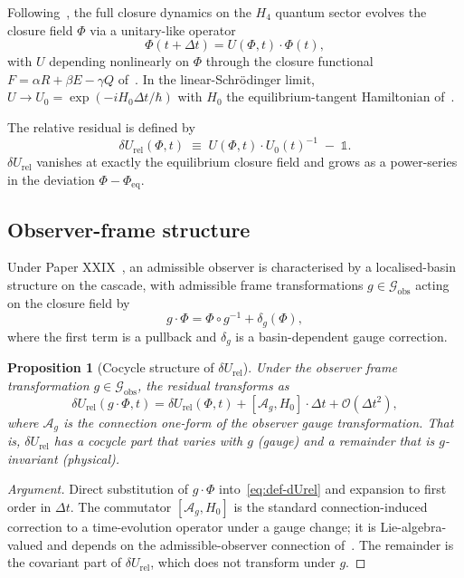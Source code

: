 \documentclass[12pt]{article}
\newtheorem{proposition}[theorem]{Proposition}
\theoremstyle{definition}
\theoremstyle{remark}
\newcommand{\dUrel}{\delta U_{\mathrm{rel}}}
\begin{document}
Following~\citep{SmartXXI}, the full closure dynamics on the $H_4$ quantum sector evolves the closure field $\Phi$ via a unitary-like operator
\begin{equation}\label{eq:full-dynamics}
\Phi(t + \Delta t) = U(\Phi, t) \cdot \Phi(t),
\end{equation}
with $U$ depending nonlinearly on $\Phi$ through the closure functional $F = \alpha R + \beta E - \gamma Q$ of~\citep{SmartXXXVI}. In the linear-Schr\"odinger limit, $U \to U_0 = \exp(-i H_0 \Delta t / \hbar)$ with $H_0$ the equilibrium-tangent Hamiltonian of~\citep{SmartXVIII}.

The relative residual is defined by
\begin{equation}\label{eq:def-dUrel}
\dUrel(\Phi, t) \;\equiv\; U(\Phi, t) \cdot U_0(t)^{-1} \;-\; \mathbb{1}.
\end{equation}
$\dUrel$ vanishes at exactly the equilibrium closure field and grows as a power-series in the deviation $\Phi - \Phi_{\mathrm{eq}}$.

\subsection{Observer-frame structure}

Under Paper XXIX~\citep{SmartXXIX}, an admissible observer is characterised by a localised-basin structure on the cascade, with admissible frame transformations $g \in \mathcal{G}_{\mathrm{obs}}$ acting on the closure field by
\begin{equation}
g \cdot \Phi = \Phi \circ g^{-1} + \delta_g(\Phi),
\end{equation}
where the first term is a pullback and $\delta_g$ is a basin-dependent gauge correction.

\begin{proposition}[Cocycle structure of $\dUrel$]\label{prop:cocycle}
Under the observer frame transformation $g \in \mathcal{G}_{\mathrm{obs}}$, the residual transforms as
\begin{equation}
\dUrel(g \cdot \Phi, t) = \dUrel(\Phi, t) + [\mathcal{A}_g, H_0] \cdot \Delta t + \mathcal{O}(\Delta t^2),
\end{equation}
where $\mathcal{A}_g$ is the connection one-form of the observer gauge transformation. That is, $\dUrel$ has a cocycle part that varies with $g$ (gauge) and a remainder that is $g$-invariant (physical).
\end{proposition}

\begin{proof}[Argument]
Direct substitution of $g \cdot \Phi$ into~\eqref{eq:def-dUrel} and expansion to first order in $\Delta t$. The commutator $[\mathcal{A}_g, H_0]$ is the standard connection-induced correction to a time-evolution operator under a gauge change; it is Lie-algebra-valued and depends on the admissible-observer connection of~\citep{SmartXXIX}. The remainder is the covariant part of $\dUrel$, which does not transform under $g$.
\end{proof}
\end{document}
